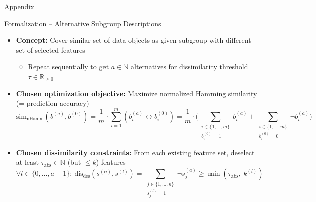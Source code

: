 \documentclass[en, navbaroff, handout]{sdqbeamer}
\begin{document}
\appendix
\beginbackup %

\begin{frame}[plain]
	\centering
	\Huge Appendix
\end{frame}

\begin{frame}[t]{Formalization -- Alternative Subgroup Descriptions}
	\begin{itemize}
		\item \textbf{Concept:} Cover similar set of data objects as given subgroup with different set of selected features
		\begin{itemize}
			\item Repeat sequentially to get $a \in \mathbb{N}$ alternatives for dissimilarity threshold~$\tau \in \mathbb{R}_{\geq 0}$
		\end{itemize}
		\vspace{\baselineskip}
		\item \textbf{Chosen optimization objective:} Maximize normalized Hamming similarity (= prediction accuracy)
		\begin{equation*}
			\text{sim}_{\text{nHamm}}(b^{(a)}, b^{(0)}) = \frac{1}{m} \cdot \sum_{i=1}^m \left( b_i^{(a)} \leftrightarrow b_i^{(0)} \right) = \frac{1}{m} \cdot \Big( \sum\limits_{\substack{i \in \{1, \dots, m\} \\ b_i^{(0)} = 1}} b_i^{(a)} + \sum\limits_{\substack{i \in \{1, \dots, m\} \\ b_i^{(0)} = 0}} \lnot b_i^{(a)} \Big)
		\end{equation*}
		\vspace{\baselineskip}
		\item \textbf{Chosen dissimilarity constraints:} From each existing feature set, deselect at least $\tau_{\text{abs}} \in \mathbb{N}$ (but $\leq k$) features
		\begin{equation*}
			\forall l \in \{0, \dots, a-1\}:~ \text{dis}_{\text{des}}(s^{(a)}, s^{(l)}) = \sum_{\substack{j \in \{1, \dots, n\} \\ s^{(l)}_j = 1}} \lnot s^{(a)}_j \geq \min \left( \tau_{\text{abs}},~k^{(l)} \right)
		\end{equation*}
	\end{itemize}
\end{frame}
\end{document}

